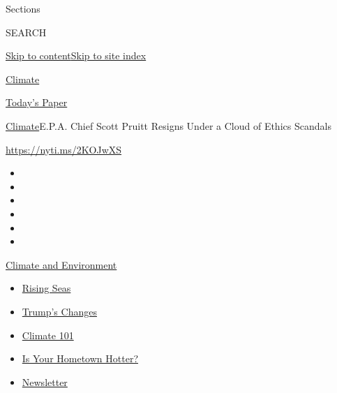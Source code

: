 Sections

SEARCH

\protect\hyperlink{site-content}{Skip to
content}\protect\hyperlink{site-index}{Skip to site index}

\href{https://www.nytimes.com/section/climate}{Climate}

\href{https://myaccount.nytimes.com/auth/login?response_type=cookie\&client_id=vi}{}

\href{https://www.nytimes.com/section/todayspaper}{Today's Paper}

\href{/section/climate}{Climate}\textbar{}E.P.A. Chief Scott Pruitt
Resigns Under a Cloud of Ethics Scandals

\url{https://nyti.ms/2KOJwXS}

\begin{itemize}
\item
\item
\item
\item
\item
\item
\end{itemize}

\href{https://www.nytimes.com/section/climate?action=click\&pgtype=Article\&state=default\&region=TOP_BANNER\&context=storylines_menu}{Climate
and Environment}

\begin{itemize}
\tightlist
\item
  \href{https://www.nytimes.com/2020/07/30/climate/sea-level-inland-floods.html?action=click\&pgtype=Article\&state=default\&region=TOP_BANNER\&context=storylines_menu}{Rising
  Seas}
\item
  \href{https://www.nytimes.com/interactive/2020/climate/trump-environment-rollbacks.html?action=click\&pgtype=Article\&state=default\&region=TOP_BANNER\&context=storylines_menu}{Trump's
  Changes}
\item
  \href{https://www.nytimes.com/interactive/2020/04/19/climate/climate-crash-course-1.html?action=click\&pgtype=Article\&state=default\&region=TOP_BANNER\&context=storylines_menu}{Climate
  101}
\item
  \href{https://www.nytimes.com/interactive/2018/08/30/climate/how-much-hotter-is-your-hometown.html?action=click\&pgtype=Article\&state=default\&region=TOP_BANNER\&context=storylines_menu}{Is
  Your Hometown Hotter?}
\item
  \href{https://www.nytimes.com/newsletters/climate-change?action=click\&pgtype=Article\&state=default\&region=TOP_BANNER\&context=storylines_menu}{Newsletter}
\end{itemize}

